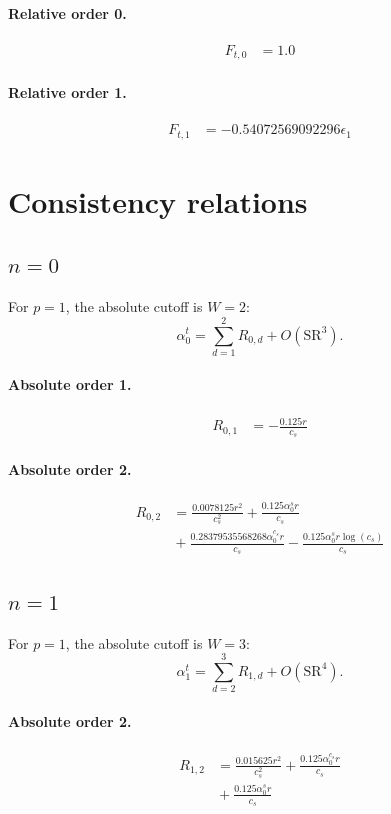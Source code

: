 \documentclass[10pt]{article}
\begin{document}
\paragraph{Relative order 0.}
\begin{align*}
F_{t,0} &= 1.0
\end{align*}

\paragraph{Relative order 1.}
\begin{align*}
F_{t,1} &=  - 0.54072569092296 \epsilon_{1}
\end{align*}

\section{Consistency relations}
\subsection{$n=0$}
For $p=1$, the absolute cutoff is $W=2$:
\[\alpha_{0}^t=\sum_{d=1}^{2}R_{0,d}+O(\mathrm{SR}^{3}).\]
\paragraph{Absolute order 1.}
\begin{align*}
R_{0,1} &=  - \frac{0.125 r}{c_{s}}
\end{align*}

\paragraph{Absolute order 2.}
\begin{align*}
R_{0,2} &= \frac{0.0078125 r^{2}}{c_{s}^{2}} + \frac{0.125 \alpha_{0}^s r}{c_{s}} \\
&{}  + \frac{0.28379535568268 \alpha_{0}^{c_s} r}{c_{s}} - \frac{0.125 \alpha_{0}^s r \log{\left(c_{s} \right)}}{c_{s}}
\end{align*}

\subsection{$n=1$}
For $p=1$, the absolute cutoff is $W=3$:
\[\alpha_{1}^t=\sum_{d=2}^{3}R_{1,d}+O(\mathrm{SR}^{4}).\]
\paragraph{Absolute order 2.}
\begin{align*}
R_{1,2} &= \frac{0.015625 r^{2}}{c_{s}^{2}} + \frac{0.125 \alpha_{0}^{c_s} r}{c_{s}} \\
&{}  + \frac{0.125 \alpha_{0}^s r}{c_{s}}
\end{align*}
\end{document}
